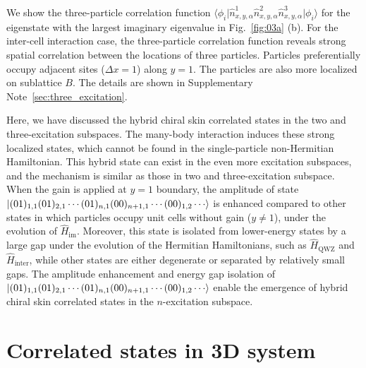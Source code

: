 \documentclass[longbibliography, aps, prx, amsmath, amssymb, amsfonts, twocolumn,superscriptaddress, footinbib]{revtex4-1}
\begin{document}
	We show the three-particle correlation function $\langle \phi_i \vert \hat{n}^1_{x,y,\alpha} \hat{n}^2_{x,y,\alpha} \hat{n}^3_{x,y,\alpha} \vert \phi_i \rangle$ for the eigenstate with the largest imaginary eigenvalue in Fig.~\ref{fig:03a} (b). 
	For the inter-cell interaction case, the three-particle correlation function reveals strong spatial correlation between the locations of three particles. Particles preferentially occupy adjacent sites ($\Delta x =1$) along $y=1$. The particles are also more localized on sublattice $B$. The details are shown in Supplementary Note~\ref{sec:three_excitation}.


	Here, we have discussed the hybrid chiral skin correlated states in the two and three-excitation subspaces. The many-body interaction induces these strong localized states, which cannot be found in the single-particle non-Hermitian Hamiltonian. This hybrid state can exist in the even more excitation subspaces, and the mechanism is similar as those in two and three-excitation subspace. 
	When the gain is applied at $y=1$ boundary, the amplitude of state $\ket{(01)_{1,1}(01)_{2,1}\cdots(01)_{n,1}(00)_{n+1,1}\cdots(00)_{1,2}\cdots}$ is enhanced compared to other states in which particles occupy unit cells without gain ($y\neq 1$), under the evolution of $\hat{H}_{\text{im}}$. Moreover, this state is isolated from lower-energy states by a large gap under the evolution of the Hermitian Hamiltonians, such as $\hat{H}_{\text{QWZ}}$ and $\hat{H}_{\text{inter}}$, while other states are either degenerate or separated by relatively small gaps. The amplitude enhancement and energy gap isolation of $\ket{(01)_{1,1}(01)_{2,1}\cdots(01)_{n,1}(00)_{n+1,1}\cdots(00)_{1,2}\cdots}$ enable the emergence of hybrid chiral skin correlated states in the $n$-excitation subspace. 


	\section{Correlated states in 3D system~\label{sec:appendC_3D}}
\end{document}

